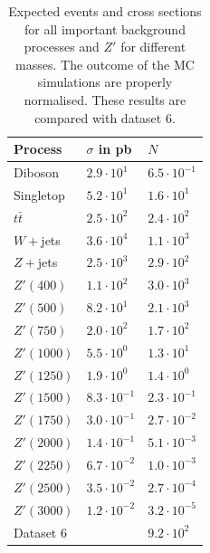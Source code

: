 \begin{table}[hb]
 \begin{tabular}{l|l|l}
 Process & $\sigma$ in pb & $N$\\
 \hline
Diboson &$2.9\cdot 10^{1}$& $6.5\cdot 10^{-1}$ \\
Singletop&$5.2\cdot 10^{1}$& $1.6\cdot 10^{1}$\\
$t\bar t$&$2.5\cdot 10^{2}$& $2.4\cdot 10^{2}$\\
$W+$jets&$3.6\cdot 10^{4}$& $1.1\cdot 10^{3}$\\
$Z+$jets&$2.5\cdot 10^{3}$& $2.9\cdot 10^{2}$\\
\hline
$Z'(400)$&$1.1\cdot 10^{2}$& $3.0\cdot 10^{3}$\\
$Z'(500)$&$8.2\cdot 10^{1}$& $2.1\cdot 10^{3}$\\
$Z'(750)$&$2.0\cdot 10^{2}$& $1.7\cdot 10^{2}$\\
$Z'(1000)$&$5.5\cdot 10^{0}$& $1.3\cdot 10^{1}$\\
$Z'(1250)$&$1.9\cdot 10^{0}$& $1.4\cdot 10^{0}$\\
$Z'(1500)$&$8.3\cdot 10^{-1}$& $2.3\cdot 10^{-1}$\\
$Z'(1750)$&$3.0\cdot 10^{-1}$& $2.7\cdot 10^{-2}$\\
$Z'(2000)$&$1.4\cdot 10^{-1}$& $5.1\cdot 10^{-3}$\\
$Z'(2250)$&$6.7\cdot 10^{-2}$& $1.0\cdot 10^{-3}$\\
$Z'(2500)$&$3.5\cdot 10^{-2}$& $2.7\cdot 10^{-4}$\\
$Z'(3000)$&$1.2\cdot 10^{-2}$& $3.2\cdot 10^{-5}$\\
\hline
Dataset 6 & & $9.2\cdot 10^{2}$
 \end{tabular}
 \caption{\small{Expected events and cross sections for all important background processes and $Z'$ for different masses. The outcome of the MC
 simulations are properly normalised. These results are compared with dataset 6.}}
 \label{tab:expEvents}
\end{table}
